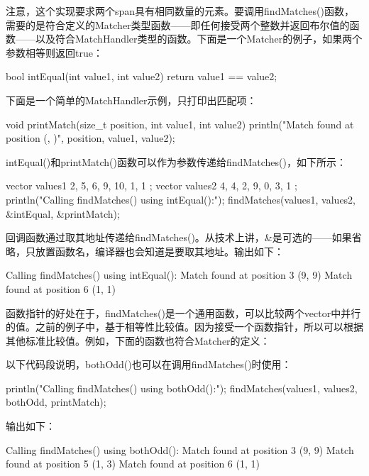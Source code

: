 注意，这个实现要求两个span具有相同数量的元素。要调用findMatches()函数，需要的是符合定义的Matcher类型函数——即任何接受两个整数并返回布尔值的函数——以及符合MatchHandler类型的函数。下面是一个Matcher的例子，如果两个参数相等则返回true：

\begin{cpp}
bool intEqual(int value1, int value2) { return value1 == value2; }
\end{cpp}

下面是一个简单的MatchHandler示例，只打印出匹配项：

\begin{cpp}
void printMatch(size_t position, int value1, int value2)
{
    println("Match found at position {} ({}, {})", position, value1, value2);
}
\end{cpp}

intEqual()和printMatch()函数可以作为参数传递给findMatches()，如下所示：

\begin{cpp}
vector values1 { 2, 5, 6, 9, 10, 1, 1 };
vector values2 { 4, 4, 2, 9, 0, 3, 1 };
println("Calling findMatches() using intEqual():");
findMatches(values1, values2, &intEqual, &printMatch);
\end{cpp}

回调函数通过取其地址传递给findMatches()。从技术上讲，\&是可选的——如果省略，只放置函数名，编译器也会知道是要取其地址。输出如下：

\begin{shell}
Calling findMatches() using intEqual():
Match found at position 3 (9, 9)
Match found at position 6 (1, 1)
\end{shell}

函数指针的好处在于，findMatches()是一个通用函数，可以比较两个vector中并行的值。之前的例子中，基于相等性比较值。因为接受一个函数指针，所以可以根据其他标准比较值。例如，下面的函数也符合Matcher的定义：


以下代码段说明，bothOdd()也可以在调用findMatches()时使用：

\begin{cpp}
println("Calling findMatches() using bothOdd():");
findMatches(values1, values2, bothOdd, printMatch);
\end{cpp}

输出如下：

\begin{shell}
Calling findMatches() using bothOdd():
Match found at position 3 (9, 9)
Match found at position 5 (1, 3)
Match found at position 6 (1, 1)
\end{shell}

